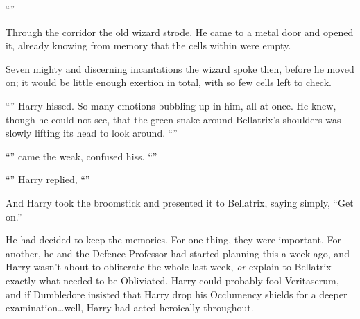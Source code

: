 “”

\later

Through the corridor the old wizard strode. He came to a metal door and opened it, already knowing from memory that the cells within were empty.

Seven mighty and discerning incantations the wizard spoke then, before he moved on; it would be little enough exertion in total, with so few cells left to check.

\later

“” Harry hissed. So many emotions bubbling up in him, all at once. He knew, though he could not see, that the green snake around Bellatrix’s shoulders was slowly lifting its head to look around. “”

“” came the weak, confused hiss. “”

“” Harry replied, “”

And Harry took the broomstick and presented it to Bellatrix, saying simply, “Get on.”

He had decided to keep the memories. For one thing, they were important. For another, he and the Defence Professor had started planning this a week ago, and Harry wasn’t about to obliterate the whole last week, \emph{or} explain to Bellatrix exactly what needed to be Obliviated. Harry could probably fool Veritaserum, and if Dumbledore insisted that Harry drop his Occlumency shields for a deeper examination…well, Harry had acted heroically throughout.

